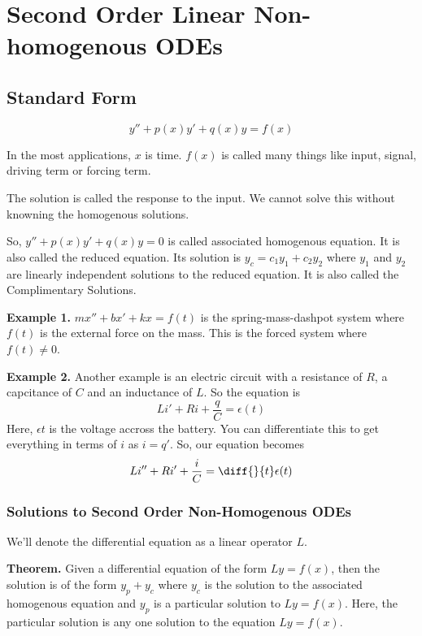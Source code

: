 

\chapter{Second Order Linear Non-homogenous ODEs}

\bigbreak

\section{Standard Form}

$$ y'' + p(x) y' + q(x) y = f(x) $$

In the most applications, $x$ is time.
$f(x)$ is called many things like input, signal, driving term or forcing term.

The solution is called the response to the input.
We cannot solve this without knowning the homogenous solutions.

So, $y'' + p(x)y' + q(x)y = 0$ is called associated homogenous equation. 
It is also called the reduced equation.
Its solution is $y_c = c_1 y_1 + c_2 y_2$ 
where $y_1$ and $y_2$ are linearly independent solutions to the reduced equation.
It is also called the Complimentary Solutions.


{\bf Example 1. } 
$mx'' + bx' + kx = f(t)$ is the spring-mass-dashpot system where $f(t)$ is the external force on the mass.
This is the forced system where $f(t) \neq 0$.

{\bf Example 2. } 
Another example is an electric circuit with a resistance of $R$,
a capcitance of $C$ and an inductance of $L$. So the equation is 
$$ Li' + Ri + \frac{q}{C} = \epsilon(t) $$
Here, $\epsilon{t}$ is the voltage accross the battery.
You can differentiate this to get everything in terms of $i$ as $i = q'$.
So, our equation becomes 
$$ Li'' + Ri' + \frac{i}{C} = \diff{}{t} \epsilon(t) $$

\subsection{Solutions to Second Order Non-Homogenous ODEs}

We'll denote the differential equation as a linear operator $L$.

\begin{mdframed}
\begin{center}
    {\bf Theorem. } Given a differential equation of the form $Ly = f(x)$, 
    then the solution is of the form $y_p + y_c$ 
    where $y_c$ is the solution to the associated homogenous equation
    and $y_p$ is a particular solution to $Ly = f(x)$.
    Here, the particular solution is any one solution to the equation $Ly = f(x)$.
\end{center}
\end{mdframed}

